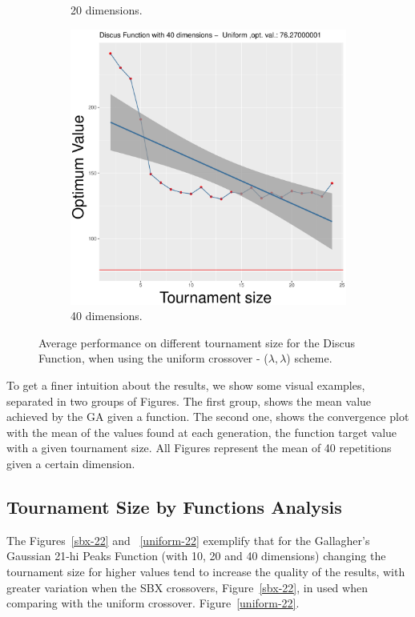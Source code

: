 \begin{figure}[t]
\begin{subfigure}[b]{0.33\textwidth}
		\caption{20 dimensions.}
	\end{subfigure}
	\begin{subfigure}[b]{0.33\textwidth}
		\centering
		\includegraphics[width=\textwidth]{img/uniform-40D/unimodal_uniform_11_dim_40.pdf}
		\caption{40 dimensions.}
	\end{subfigure}
	\caption{Average performance on different tournament size for the Discus Function, when using the uniform crossover - ($\lambda, \lambda$) scheme.}
	\label{uniform-11}
\end{figure}


To get a finer intuition about the results, we show  some visual examples, separated in two groups of Figures. The first group, shows the mean value achieved by the GA given a function. The second one, shows the convergence plot with the mean of the values found at each generation, the function target value with a given tournament size. All Figures represent the mean of 40 repetitions given a certain dimension.



\subsection{Tournament Size by Functions Analysis}
The Figures~\ref{sbx-22} and ~\ref{uniform-22} exemplify that for the Gallagher's Gaussian 21-hi Peaks Function (with 10, 20 and 40 dimensions) changing the tournament size for higher values tend to increase the quality of the results, with greater variation when the SBX crossovers, Figure~\ref{sbx-22}, in used when comparing with the uniform crossover. Figure~\ref{uniform-22}.


